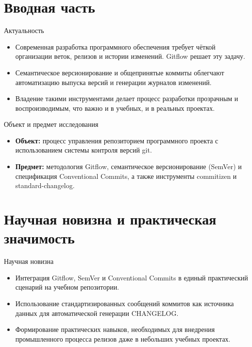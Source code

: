 \documentclass[
  ignorenonframetext,
  aspectratio=169,
  russian,
  aspectratio=169]{beamer}
\providecommand{\tightlist}{%
  \setlength{\itemsep}{0pt}\setlength{\parskip}{0pt}}
\begin{document}
\section{Вводная
часть}\label{ux432ux432ux43eux434ux43dux430ux44f-ux447ux430ux441ux442ux44c}

\begin{frame}{Актуальность}
\label{ux430ux43aux442ux443ux430ux43bux44cux43dux43eux441ux442ux44c}
\begin{itemize}[<+->]
\tightlist
\item
  Современная разработка программного обеспечения требует чёткой
  организации веток, релизов и истории изменений. Gitflow решает эту
  задачу.
\item
  Семантическое версионирование и общепринятые коммиты облегчают
  автоматизацию выпуска версий и генерации журналов изменений.
\item
  Владение такими инструментами делает процесс разработки прозрачным и
  воспроизводимым, что важно и в учебных, и в реальных проектах.
\end{itemize}
\end{frame}

\begin{frame}{Объект и предмет исследования}
\label{ux43eux431ux44aux435ux43aux442-ux438-ux43fux440ux435ux434ux43cux435ux442-ux438ux441ux441ux43bux435ux434ux43eux432ux430ux43dux438ux44f}
\begin{itemize}[<+->]
\tightlist
\item
  \textbf{Объект:} процесс управления репозиторием программного проекта
  с использованием системы контроля версий git.
\item
  \textbf{Предмет:} методология Gitflow, семантическое версионирование
  (SemVer) и спецификация Conventional Commits, а также инструменты
  commitizen и standard-changelog.
\end{itemize}
\end{frame}

\section{Научная новизна и практическая
значимость}\label{ux43dux430ux443ux447ux43dux430ux44f-ux43dux43eux432ux438ux437ux43dux430-ux438-ux43fux440ux430ux43aux442ux438ux447ux435ux441ux43aux430ux44f-ux437ux43dux430ux447ux438ux43cux43eux441ux442ux44c}

\begin{frame}{Научная новизна}
\label{ux43dux430ux443ux447ux43dux430ux44f-ux43dux43eux432ux438ux437ux43dux430}
\begin{itemize}[<+->]
\tightlist
\item
  Интеграция Gitflow, SemVer и Conventional Commits в единый
  практический сценарий на учебном репозитории.
\item
  Использование стандартизированных сообщений коммитов как источника
  данных для автоматической генерации CHANGELOG.
\item
  Формирование практических навыков, необходимых для внедрения
  промышленного процесса релизов даже в небольших учебных проектах.
\end{itemize}
\end{frame}
\end{document}
